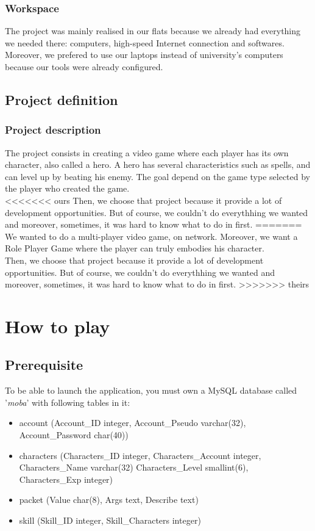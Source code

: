 \documentclass{scrreprt}
\begin{document}
		  \section{Workspace}
		  The project was mainly realised in our flats because we already had everything we needed there:
		  computers, high-speed Internet connection and softwares. Moreover, we prefered to use our laptops
		  instead of university's computers because our tools were already configured.

		  \chapter{Project definition}
		  \section{Project description} %
		  The project consists in creating a video game where each player has its own character, also 
		  called a hero. A hero has several characteristics such as %
		  spells, and can level up by beating his enemy. The goal depend on the game type selected by the player who created the game.\\

<<<<<<< ours
		  Then, we choose that project because it provide a lot of development opportunities. But of course, we couldn't do everythhing we wanted and moreover, sometimes, it was hard to know what to do in first.
=======
		 We wanted to do a multi-player video game, on network. Moreover, we want a Role Player Game where the player can truly embodies his character.\\

		 Then, we choose that project because it provide a lot of development opportunities. But of course, we couldn't do everythhing we wanted and moreover, sometimes, it was hard to know what to do in first.
>>>>>>> theirs

		  \part{How to play}
		  \chapter{Prerequisite}
		  To be able to launch the application, you must own a MySQL database called '\emph{moba}' with following tables in it:
		  \begin{itemize}
		  \item{account (Account\_ID integer, Account\_Pseudo varchar(32), Account\_Password char(40))}
		  \item{characters (Characters\_ID integer, Characters\_Account integer, Characters\_Name varchar(32) Characters\_Level smallint(6), Characters\_Exp integer)}
		  \item{packet (Value char(8), Args text, Describe text)}
		  \item{skill (Skill\_ID integer, Skill\_Characters integer)}
		  \end{itemize}
\end{document}
